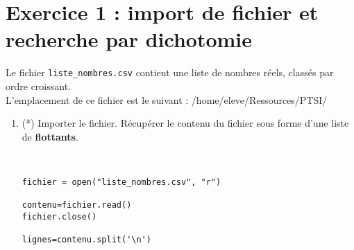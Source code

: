 \section*{Exercice 1 : import de fichier et recherche par dichotomie}
\noindent Le fichier \verb?liste_nombres.csv? contient une liste de nombres réels, classés par ordre croissant. \\
L'emplacement de ce fichier est le suivant : /home/eleve/Ressources/PTSI/
\begin{enumerate}
\item (*) Importer le fichier. Récupérer le contenu du fichier sous forme d'une liste de \textbf{flottants}.
\begin{solution}~ \\\vspace{-0.7cm}
\begin{verbatim}
fichier = open("liste_nombres.csv", "r")

contenu=fichier.read()
fichier.close()

lignes=contenu.split('\n')


\end{verbatim}
\end{solution}
\end{enumerate}
